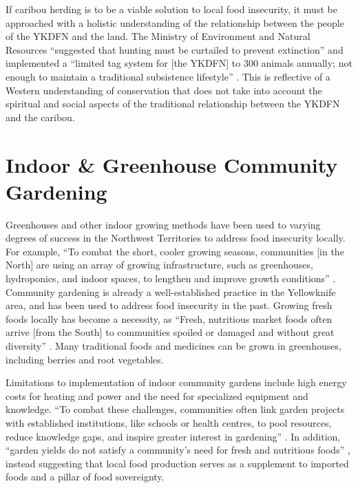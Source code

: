 \documentclass{report}
\begin{document}
\hspace{24pt} If caribou herding is to be a viable solution to local food insecurity, it must be approached with a holistic understanding of the relationship between the people of the YKDFN and the land. The Ministry of Environment and Natural Resources ``suggested that hunting must be curtailed to prevent extinction'' and implemented a ``limited tag system for [the YKDFN] to 300 animals annually; not enough to maintain a traditional subsistence lifestyle'' \parencite[230]{denefoodwaysontologies}. This is reflective of a Western understanding of conservation that does not take into account the spiritual and social aspects of the traditional relationship between the YKDFN and the caribou.

\section{Indoor \& Greenhouse Community Gardening}

\hspace{24pt} Greenhouses and other indoor growing methods have been used to varying degrees of success in the Northwest Territories to address food insecurity locally. For example, ``To combat the short, cooler growing seasons, communities [in the North] are using an array of growing infrastructure, such as greenhouses, hydroponics, and indoor spaces, to lengthen and improve growth conditions'' \parencite[90]{resilientcommunities}. Community gardening is already a well-established practice in the Yellowknife area, and has been used to address food insecurity in the past. Growing fresh foods locally has become a necessity, as ``Fresh, nutritious market foods often arrive [from the South] to communities spoiled or damaged and without great diversity'' \parencite[85]{resilientcommunities}. Many traditional foods and medicines can be grown in greenhouses, including berries and root vegetables.

\hspace{24pt} Limitations to implementation of indoor community gardens include high energy costs for heating and power and the need for specialized equipment and knowledge. ``To combat these challenges, communities often link garden projects with established institutions, like schools or health centres, to pool resources, reduce knowledge gaps, and inspire greater interest in gardening'' \parencite[90]{resilientcommunities}. In addition, ``garden yields do not satisfy a community's need for fresh and nutritious foods'' \parencite[85]{resilientcommunities}, instead suggesting that local food production serves as a supplement to imported foods and a pillar of food sovereignty.
\end{document}
